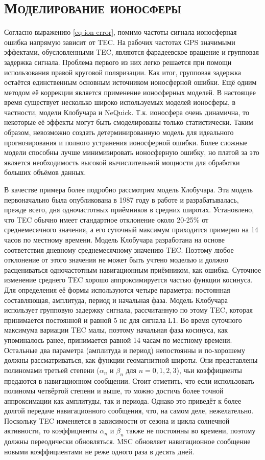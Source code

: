\section{\textsc{Моделирование ионосферы}}

Согласно выражению \eqref{eq-ion-error}, помимо частоты сигнала ионосферная ошибка напрямую зависит от TEC.
На рабочих частотах GPS значимыми эффектами, обусловленными TEC, являются фарадеевское вращение и групповая задержка сигнала.
Проблема первого из них легко решается при помощи использования правой круговой поляризации.
Как итог, групповая задержка остаётся единственным основным источником ионосферной ошибки.
Ещё одним методом её коррекции является применение ионосферных моделей. 
В настоящее время существует несколько широко используемых моделей ионосферы, в частности, модели Клобучара и NeQuick. 
Т.к. ионосфера очень динамична, то некоторые её эффекты могут быть смоделированы только статистически.
Таким образом, невозможно создать детерминированную модель для идеального прогнозирования и полного устранения ионосферной ошибки.
Более сложные модели способны лучше минимизировать ионосферную ошибку, но платой за это является необходимость высокой вычислительной мощности для обработки больших объёмов данных.

В качестве примера более подробно рассмотрим модель Клобучара.
Эта модель первоначально была опубликована в 1987 году в работе \cite{Klobuchar1987} и разрабатывалась, прежде всего, дня одночастотных приёмников в средних широтах.
Установлено, что TEC обычно имеет стандартное отклонение около 20-25\% от среднемесячного значения, а его суточный максимум приходится примерно на 14 часов по местному времени.
Модель Клобучара разработана на основе соответствия дневному среднемесячному значению TEC.
Поэтому любое отклонение от этого значения не может быть учтено моделью и должно расцениваться одночастотным навигационным приёмником, как ошибка.
Суточное изменение среднего TEC хорошо аппроксимируется частью функции косинуса.
Для определения её формы используются четыре параметра: постоянная составляющая, амплитуда, период и начальная фаза.
Модель Клобучара использует групповую задержку сигнала, рассчитанную по этому TEC, которая принимается постоянной и равной 5 нс для сигнала L1.
Во время суточного максимума вариации TEC малы, поэтому начальная фаза косинуса, как упоминалось ранее, принимается равной 14 часам по местному времени.
Остальные два параметра (амплитуда и период) непостоянны и по-хорошему должны рассматриваться, как функции геомагнитной широты.
Они представлены полиномами третьей степени ($\alpha_n$ и $\beta_n$ для $n=0,1,2,3$), чьи коэффициенты предаются в навигационном сообщении.
Стоит отметить, что если использовать полиномы четвёртой степени и выше, то можно достичь более точной аппроксимации как амплитуды, так и периода.
Однако это приведёт к более долгой передаче навигационного сообщения, что, на самом деле, нежелательно.
Поскольку TEC изменяется в зависимости от сезона и цикла солнечной активности, то коэффициенты $\alpha_n$ и $\beta_n$ также не постоянны во времени, поэтому должны переодически обновляться.
MSC обновляет навигационное сообщение новыми коэффициентами не реже одного раза в десять дней.

